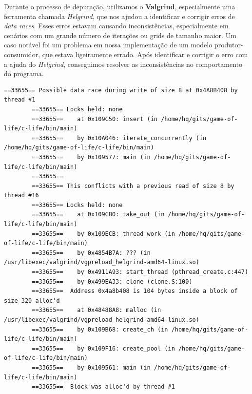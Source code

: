 \documentclass[14]{article}
\begin{document}
Durante o processo de depuração, utilizamos o \textbf{Valgrind}, especialmente uma ferramenta chamada \textit{Helgrind}, que nos ajudou a identificar e corrigir erros de \textit{data races}. Esses erros estavam causando inconsistências, especialmente em cenários com um grande número de iterações ou grids de tamanho maior.  
Um caso notável foi um problema em nossa implementação de um modelo produtor-consumidor, que estava ligeiramente errado. Após identificar e corrigir o erro com a ajuda do \textit{Helgrind}, conseguimos resolver as inconsistências no comportamento do programa.  

{
    \small
    \begin{lstlisting}[breaklines]
        ==33655== Possible data race during write of size 8 at 0x4A8B408 by thread #1
        ==33655== Locks held: none
        ==33655==    at 0x109C50: insert (in /home/hq/gits/game-of-life/c-life/bin/main)
        ==33655==    by 0x10A046: iterate_concurrently (in /home/hq/gits/game-of-life/c-life/bin/main)
        ==33655==    by 0x109577: main (in /home/hq/gits/game-of-life/c-life/bin/main)
        ==33655== 
        ==33655== This conflicts with a previous read of size 8 by thread #16
        ==33655== Locks held: none
        ==33655==    at 0x109CB0: take_out (in /home/hq/gits/game-of-life/c-life/bin/main)
        ==33655==    by 0x109ECB: thread_work (in /home/hq/gits/game-of-life/c-life/bin/main)
        ==33655==    by 0x4854B7A: ??? (in /usr/libexec/valgrind/vgpreload_helgrind-amd64-linux.so)
        ==33655==    by 0x4911A93: start_thread (pthread_create.c:447)
        ==33655==    by 0x499EA33: clone (clone.S:100)
        ==33655==  Address 0x4a8b408 is 104 bytes inside a block of size 320 alloc'd
        ==33655==    at 0x48488A8: malloc (in /usr/libexec/valgrind/vgpreload_helgrind-amd64-linux.so)
        ==33655==    by 0x109B68: create_ch (in /home/hq/gits/game-of-life/c-life/bin/main)
        ==33655==    by 0x109F16: create_pool (in /home/hq/gits/game-of-life/c-life/bin/main)
        ==33655==    by 0x109561: main (in /home/hq/gits/game-of-life/c-life/bin/main)
        ==33655==  Block was alloc'd by thread #1    
    \end{lstlisting}  
}
    
    
    


\end{document}
